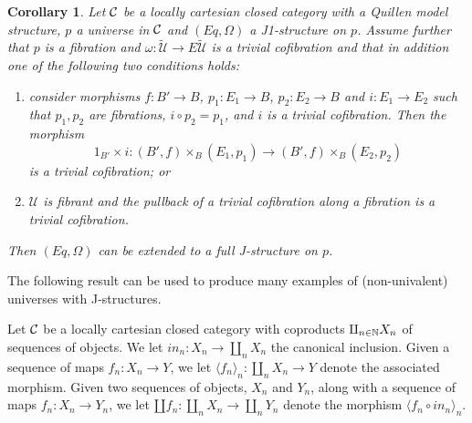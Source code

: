 \documentclass[12pt]{article}
\numberwithin{equation}{section}
\newtheorem{cor}[proposition]{Corollary}
\newcommand{\sr}{\rightarrow}
\newcommand{\nn}{{\mathbb N\rm}}
\newcommand{\wt}{\widetilde}
\newcommand{\id}{1}            %
\newcommand{\U}{\mathcal{U}}
\begin{document}
\begin{cor}
\label{2015.05.18.cor1} Let $\cal C$ be a locally cartesian closed category
with a Quillen model structure, $p$ a universe in $\cal C$ and $(Eq,\Omega)$ a
J1-structure on $p$. Assume further that $p$ is a fibration and $\omega : \wt{\U}\sr E\wt{\U}$ is a
trivial cofibration and that in addition one of the following two conditions
holds:
%
\begin{enumerate}
\item consider morphisms $f: B'\sr B$, $p_1:E_1\sr B$, $p_2:E_2\sr B$ and
  $i:E_1\sr E_2$ such that $p_1,p_2$ are fibrations, $i \circ p_2 = p_1$, and $i$ is a trivial
  cofibration. Then the morphism
%
$$\id_{B'}\times i: (B',f)\times_B(E_1,p_1)\sr (B',f)\times_B(E_2,p_2)$$
%
is a trivial cofibration; or
%
\item $\U$ is fibrant and the pullback of a trivial cofibration along a
  fibration is a trivial cofibration.
\end{enumerate}
%
Then $(Eq,\Omega)$ can be extended to a full J-structure on $p$.
\end{cor}
%

The following result can be used to produce many examples of (non-univalent) universes with
J-structures.

Let $\cal C$ be a locally
cartesian closed category with coproducts $\amalg_{n\in\nn}X_n$ of sequences of objects.
We let $in_n:X_n\sr \amalg_n X_n$ the canonical inclusion.
Given a sequence of maps $f_n : X_n \sr Y$, we let
$\langle f_n \rangle_{n} : \amalg_n X_n\sr Y$ denote the associated morphism.
Given two sequences of objects, $X_n$ and $Y_n$, along with a sequence of maps $f_n : X_n \sr Y_n$,
we let $\amalg f_n : \amalg_n X_n \sr \amalg_n Y_n$ denote the morphism $\langle f_n\circ in_n \rangle_{n}$.
\end{document}
